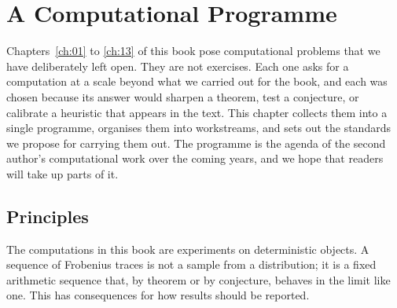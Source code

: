 \chapter{A Computational Programme}\label{ch:14}

Chapters~\ref{ch:01} to \ref{ch:13} of this book pose computational problems that we have deliberately left open. They are not exercises. Each one asks for a computation at a scale beyond what we carried out for the book, and each was chosen because its answer would sharpen a theorem, test a conjecture, or calibrate a heuristic that appears in the text. This chapter collects them into a single programme, organises them into workstreams, and sets out the standards we propose for carrying them out. The programme is the agenda of the second author's computational work over the coming years, and we hope that readers will take up parts of it.

\section{Principles}

The computations in this book are experiments on deterministic objects. A sequence of Frobenius traces is not a sample from a distribution; it is a fixed arithmetic sequence that, by theorem or by conjecture, behaves in the limit like one. This has consequences for how results should be reported.

